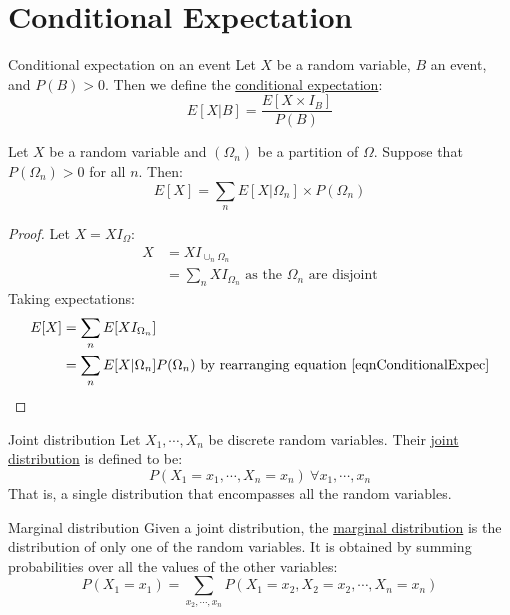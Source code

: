 \documentclass[../Main.tex]{subfiles}
\begin{document}
\section{Conditional Expectation}
\begin{definition}{Conditional expectation on an event}
    Let $X$ be a random variable, $B$ an event, and $P(B) > 0$. Then we define the \underline{conditional expectation}:
    \begin{equation}
        E[X | B] = \frac{E[X \times I_B]}{P(B)}
        \label{eqnConditionalExpec}
    \end{equation}
\end{definition}
\begin{lemma}
    Let $X$ be a random variable and $(\Omega_n)$ be a partition of $\Omega$. Suppose that $P(\Omega_n) > 0$ for all $n$. Then:
    \begin{equation*}
        E[X] = \sum_n E[X | \Omega_n] \times P(\Omega_n)
    \end{equation*}
\end{lemma}
\begin{proof}
    Let $X = XI_\Omega$:
    \begin{align*}
        X &= XI_{\cup_n \Omega_n} \\
        &= \sum_n XI_{\Omega_n} \text{ as the } \Omega_n \text{ are disjoint}
    \end{align*}
    Taking expectations:
    \begin{align*}
        E[X] &= \sum_n E[XI_{\Omega_n}] \\
        &= \sum_n E[X | \Omega_n] P(\Omega_n) \text{ by rearranging equation~\ref{eqnConditionalExpec}}
    \end{align*}
\end{proof}
\begin{definition}{Joint distribution}
    Let $X_1, \cdots, X_n$ be discrete random variables. Their \underline{joint distribution} is defined to be:
    \begin{equation*}
        P(X_1 = x_1, \cdots, X_n = x_n)~\forall x_1, \cdots, x_n
    \end{equation*}
    That is, a single distribution that encompasses all the random variables.
\end{definition}
\begin{definition}{Marginal distribution}
    Given a joint distribution, the \underline{marginal distribution} is the distribution of only one of the random variables. It is obtained by summing probabilities over all the values of the other variables:
    \begin{equation*}
        P(X_1 = x_1) = \sum_{x_2, \cdots, x_n} P(X_1 = x_2, X_2 = x_2, \cdots, X_n = x_n)
    \end{equation*}
\end{definition}
\end{document}
